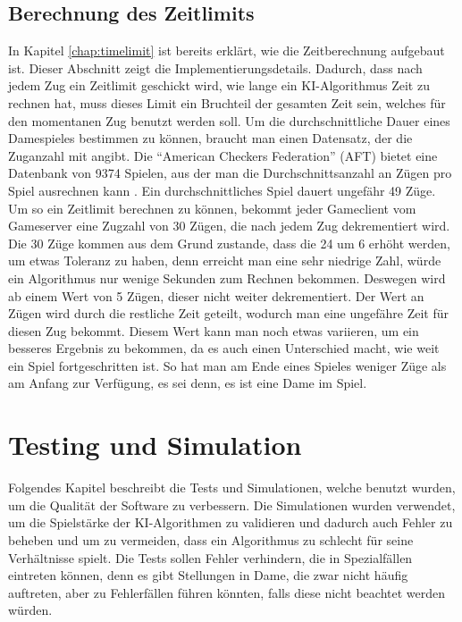 \documentclass[12pt,a4paper,bibliography=totocnumbered,listof=totocnumbered]{article}
\begin{document}
\subsection{Berechnung des Zeitlimits}
In Kapitel \ref{chap:timelimit} ist bereits erklärt, wie die Zeitberechnung aufgebaut ist. Dieser Abschnitt zeigt die Implementierungsdetails.
Dadurch, dass nach jedem Zug ein Zeitlimit geschickt wird, wie lange ein \ac{KI}-Algorithmus Zeit zu rechnen hat, muss dieses Limit ein Bruchteil 
der gesamten Zeit sein, welches für den momentanen Zug benutzt werden soll. Um die durchschnittliche Dauer eines Damespieles bestimmen zu können,
braucht man einen Datensatz, der die Zuganzahl mit angibt. Die ``American Checkers Federation'' (AFT) bietet eine Datenbank von 9374 Spielen,
aus der man die Durchschnittsanzahl an Zügen pro Spiel ausrechnen kann \cite{CheckersFederation}. Ein durchschnittliches Spiel 
dauert ungefähr 49 Züge. Um so ein Zeitlimit berechnen zu können, bekommt jeder Gameclient vom Gameserver eine Zugzahl von 30 Zügen, die nach jedem Zug 
dekrementiert wird. Die 30 Züge kommen aus dem Grund zustande, dass die 24 um 6 erhöht werden, um etwas Toleranz zu haben, denn erreicht man 
eine sehr niedrige Zahl, würde ein Algorithmus nur wenige Sekunden zum Rechnen bekommen. Deswegen wird ab einem Wert von 5 Zügen, 
dieser nicht weiter dekrementiert. Der Wert an Zügen wird durch 
die restliche Zeit geteilt, wodurch man eine ungefähre Zeit für diesen Zug bekommt. Diesem Wert kann man noch etwas variieren, um 
ein besseres Ergebnis zu bekommen, da es auch einen Unterschied macht, wie weit ein Spiel fortgeschritten ist. So hat man am Ende eines Spieles 
weniger Züge als am Anfang zur Verfügung, es sei denn, es ist eine Dame im Spiel. 

\pagebreak

\section{Testing und Simulation}
Folgendes Kapitel beschreibt die Tests und Simulationen, welche benutzt wurden, um die Qualität der Software zu verbessern. Die Simulationen wurden verwendet, um 
die Spielstärke der \ac{KI}-Algorithmen zu validieren und dadurch auch Fehler zu beheben und um zu vermeiden, dass ein Algorithmus zu schlecht für seine Verhältnisse spielt.
Die Tests sollen Fehler verhindern, die in Spezialfällen eintreten können, denn es gibt Stellungen in Dame, die zwar nicht häufig auftreten, 
aber zu Fehlerfällen führen könnten, falls diese nicht beachtet werden würden.
\end{document}
